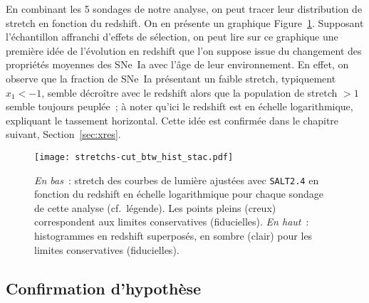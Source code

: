 \documentclass[../main/main.tex]{subfiles}
\begin{document}
En combinant les 5 sondages de notre analyse, on peut tracer leur distribution
de stretch en fonction du redshift. On en présente un graphique
Figure~\ref{fig:sample}. Supposant l'échantillon affranchi d'effets de
sélection, on peut lire sur ce graphique une première idée de l'évolution en
redshift que l'on suppose issue du changement des propriétés moyennes des SNe~Ia
avec l'âge de leur environnement. En effet, on observe que la fraction de SNe~Ia
présentant un faible stretch, typiquement $x_1 < -1$, semble décroître avec le
redshift alors que la population de stretch $> 1$ semble toujours peuplée~; à
noter qu'ici le redshift est en échelle logarithmique, expliquant le tassement
horizontal. Cette idée est confirmée dans le chapitre suivant,
Section~\ref{sec:xres}.

\begin{figure}
    \centering
    \texttt{[image: stretchs-cut\_btw\_hist\_stac.pdf]}
    \caption{\textit{En bas}~: stretch des courbes de lumière ajustées avec
        \textsc{\texttt{SALT2.4}} en fonction du redshift en échelle
        logarithmique pour chaque sondage de cette analyse (cf.~légende). Les
        points pleins (creux) correspondent aux limites conservatives
        (fiducielles). \textit{En haut}~: histogrammes en redshift superposés,
        en sombre (clair) pour les limites conservatives
    (fiducielles).}\label{fig:sample}
\end{figure}


\subsection{Confirmation d'hypothèse}\label{ssec:testvl}


\shorthandoff{:}

\end{document}
